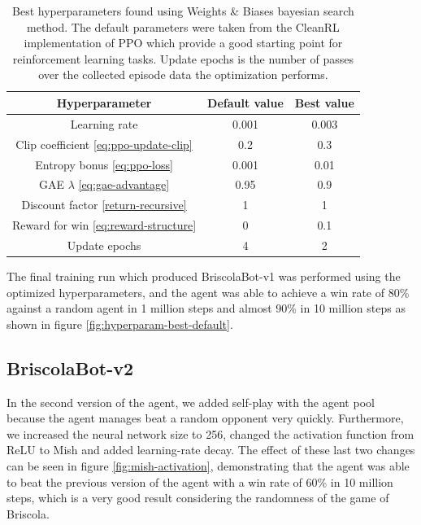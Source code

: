 \begin{table}[H]
    \centering
    \begin{tabular}{ccc}
        \hline
        Hyperparameter & Default value & Best value \\
        \hline
        Learning rate & 0.001 & 0.003 \\
        Clip coefficient \eqref{eq:ppo-update-clip} & 0.2 & 0.3\\
        Entropy bonus \eqref{eq:ppo-loss} & 0.001 & 0.01 \\
        GAE $\lambda$ \eqref{eq:gae-advantage} & 0.95 & 0.9 \\
        Discount factor \eqref{return-recursive} & 1 & 1 \\
        Reward for win \eqref{eq:reward-structure} & 0 & 0.1 \\
        Update epochs & 4 & 2 \\
    \end{tabular}
    \caption{Best hyperparameters found using Weights \& Biases bayesian search method. The default parameters were taken from the CleanRL implementation of PPO \cite{huang2022cleanrl} which provide a good starting point for reinforcement learning tasks. Update epochs is the number of passes over the collected episode data the optimization performs.}
    \label{tab:hyperparam-best}
\end{table}

The final training run which produced BriscolaBot-v1 was performed using the optimized hyperparameters, and the agent was able to achieve a win rate of 80\% against a random agent in 1 million steps and almost 90\% in 10 million steps as shown in figure \ref{fig:hyperparam-best-default}.

\subsection{BriscolaBot-v2}
In the second version of the agent, we added self-play with the agent pool because the agent manages beat a random opponent very quickly. Furthermore, we increased the neural network size to 256, changed the activation function from ReLU to Mish \cite{misra2019mish} and added learning-rate decay. The effect of these last two changes can be seen in figure \ref{fig:mish-activation}, demonstrating that the agent was able to beat the previous version of the agent with a win rate of 60\% in 10 million steps, which is a very good result considering the randomness of the game of Briscola.

